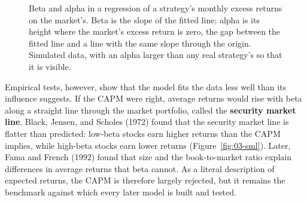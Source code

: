 \begin{figure}[!htbp]
\caption{Beta and alpha in a regression of a strategy's monthly excess returns on the market's. Beta is the slope of the fitted line; alpha is its height where the market's excess return is zero, the gap between the fitted line and a line with the same slope through the origin. Simulated data, with an alpha larger than any real strategy's so that it is visible.}
\label{fig:03-alpha}
\end{figure}

Empirical tests, however, show that the model fits the data less well than its influence suggests. If the CAPM were right, average returns would rise with beta along a straight line through the market portfolio, called the \textbf{security market line}. Black, Jensen, and Scholes (1972) found that the security market line is flatter than predicted: low-beta stocks earn higher returns than the CAPM implies, while high-beta stocks earn lower returns (Figure~\ref{fig:03-sml}). Later, Fama and French (1992) found that size and the book-to-market ratio explain differences in average returns that beta cannot. As a literal description of expected returns, the CAPM is therefore largely rejected, but it remains the benchmark against which every later model is built and tested.

